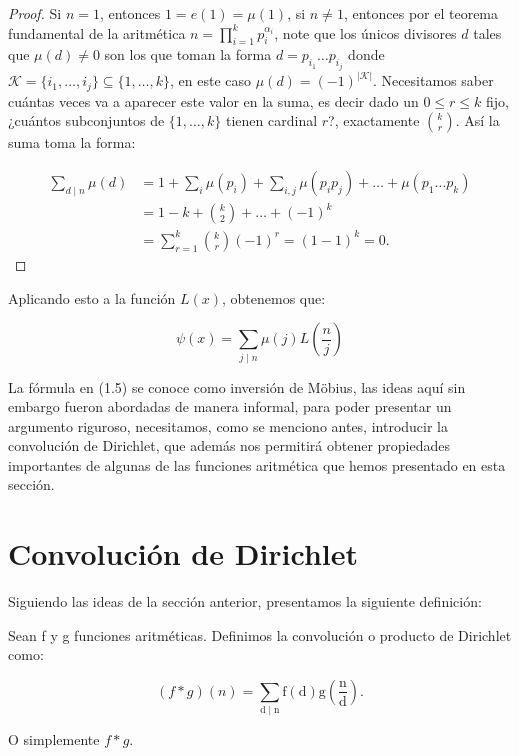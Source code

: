 \begin{proof}

Si $n=1$, entonces $1=e(1)=\mu(1)$, si $n\neq 1$, entonces por el teorema fundamental de la aritmética $n=\displaystyle\prod_{i=1}^k p_i^{\alpha_i}$, note que los únicos divisores $d$ tales que $\mu(d)\neq 0$ son los que toman la forma $d=p_{i_1}\ldots p_{i_j}$ donde $\mathcal{K}=\{i_1,\ldots, i_j\}\subseteq \{1,\ldots,k\}$, en este caso $\mu(d)=(-1)^{|\mathcal{K}|}$. Necesitamos saber cuántas veces va a aparecer este valor en la suma, es decir dado un $0\leq r\leq k$ fijo, ¿cuántos subconjuntos de $\{1,\ldots,k\}$ tienen cardinal $r$?, exactamente $\displaystyle \binom{k}{r}$. Así la suma toma la forma:

\begin{align*}
    \sum_{d\mid n}\mu(d)&=1+\sum_{i}\mu(p_i)+\sum_{i,j}\mu(p_ip_j)+\ldots+\mu(p_1\ldots p_k)\\
    &=1-k+\binom{k}{2}+\ldots+(-1)^k\\
    &=\sum_{r=1}^k\binom{k}{r}(-1)^r=(1-1)^k=0
.\end{align*}

\end{proof}

Aplicando esto a la función $L(x)$, obtenemos que:

$$\psi(x)=\sum_{j\mid n} \mu(j)L \left( \frac{n}{j} \right)$$

La fórmula en (1.5) se conoce como inversión de Möbius, las ideas aquí sin embargo fueron abordadas de manera informal, para poder presentar un argumento riguroso, necesitamos, como se menciono antes, introducir la convolución de Dirichlet, que además nos permitirá obtener propiedades importantes de algunas de las funciones aritmética que hemos presentado en esta sección.

\section{Convolución de Dirichlet}

Siguiendo las ideas de la  sección anterior, presentamos la siguiente definición:
\pagebreak

\begin{definition}
Sean f y g funciones aritméticas. Definimos la convolución o producto de Dirichlet como: 

$$(f*g)(n)=\sum_{\mathrm{d} \mid \mathrm{n}} \mathrm{f}(\mathrm{d}) \mathrm{g}\left(\frac{\mathrm{n}}{\mathrm{d}}\right).$$

O simplemente $f*g$.
\end{definition}

